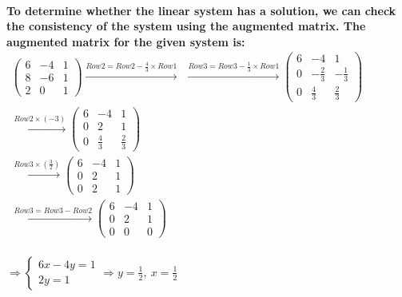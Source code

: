 \paragraph{To determine whether the linear system has a solution, we can check the consistency of the system using the augmented matrix. The augmented matrix for the given system is:
    $
        \begin{matrix}
            \begin{pmatrix}
                6 & -4 & 1 \\
                8 & -6 & 1 \\
                2 & 0  & 1
            \end{pmatrix}
            \overset{Row2 = Row2 - \frac{4}{3} \times Row1}{\longrightarrow} \ \
            \overset{Row3 = Row3 - \frac{1}{3} \times Row1}{\longrightarrow}
            \begin{pmatrix}
                6 & -4           & 1            \\
                0 & -\frac{2}{3} & -\frac{1}{3} \\
                0 & \frac{4}{3}  & \frac{2}{3}
            \end{pmatrix} \\
            \overset{Row2 \times (-3)}{\longrightarrow}
            \begin{pmatrix}
                6 & -4          & 1           \\
                0 & 2           & 1           \\
                0 & \frac{4}{3} & \frac{2}{3}
            \end{pmatrix}   \\
            \overset{Row3 \times (\frac{3}{2})}{\longrightarrow}
            \begin{pmatrix}
                6 & -4 & 1 \\
                0 & 2  & 1 \\
                0 & 2  & 1
            \end{pmatrix}                  \\
            \overset{Row3 = Row3 - Row2}{\longrightarrow}
            \begin{pmatrix}
                6 & -4 & 1 \\
                0 & 2  & 1 \\
                0 & 0  & 0
            \end{pmatrix}
        \end{matrix}
    $}
\paragraph{$\Rightarrow \left\{
        \begin{matrix}
            6x-4y=1 \\
            2y=1
        \end{matrix}
        \Rightarrow
        y=\frac{1}{2},\ x=\frac{1}{2}
        \right.$}
